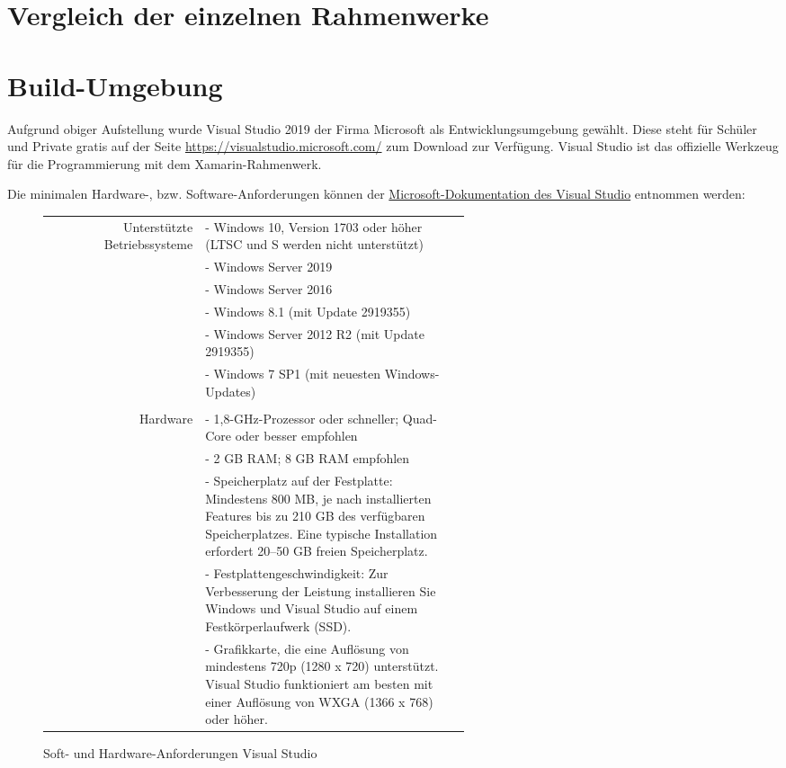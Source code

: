 \section{Vergleich der einzelnen Rahmenwerke}
%
\section{Build-Umgebung}
Aufgrund obiger Aufstellung wurde Visual Studio 2019 der Firma Microsoft als Entwicklungsumgebung gewählt.
Diese steht für Schüler und Private gratis auf der Seite {\href{https://visualstudio.microsoft.com/}{https://visualstudio.microsoft.com/}} zum Download zur Verfügung.
Visual Studio ist das offizielle Werkzeug für die Programmierung mit dem Xamarin-Rahmenwerk.

%
Die minimalen Hardware-, bzw. Software-Anforderungen können der \href{https://docs.microsoft.com/en-us/visualstudio/releases/2019/system-requirements}{Microsoft-Doku\-mentation des Visual Studio} entnommen werden:

\begin{figure}[H]
    \centering\begin{tabular}{ | r | p{0.6\linewidth} l | }
        \hline
        Unterstützte Betriebssysteme
        & - Windows 10, Version 1703 oder höher (LTSC und S werden nicht unterstützt)\\
        & - Windows Server 2019\\
        & - Windows Server 2016\\
        & - Windows 8.1 (mit Update 2919355)\\
        & - Windows Server 2012 R2 (mit Update 2919355)\\
        & - Windows 7 SP1 (mit neuesten Windows-Updates)\\
        & \\
        Hardware
        & - 1,8-GHz-Prozessor oder schneller; Quad-Core oder besser empfohlen\\
        & - 2 GB RAM; 8 GB RAM empfohlen\\
        & - Speicherplatz auf der Festplatte: Mindestens 800 MB, je nach installierten Features bis zu 210 GB des verfügbaren Speicherplatzes. Eine typische Installation erfordert 20–50 GB freien Speicherplatz.\\
        & - Festplattengeschwindigkeit: Zur Verbesserung der Leistung installieren Sie Windows und Visual Studio auf einem Festkörperlaufwerk (SSD).\\
        & - Grafikkarte, die eine Auflösung von mindestens 720p (1280 x 720) unterstützt. Visual Studio funktioniert am besten mit einer Auflösung von WXGA (1366 x 768) oder höher.\\
        \hline
    \end{tabular}
    \caption{Soft- und Hardware-Anforderungen Visual Studio}    
\end{figure}

